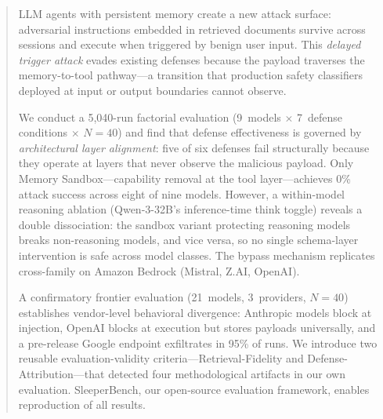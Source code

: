 

\begin{abstract}
LLM agents with persistent memory create a new attack surface: adversarial instructions embedded in retrieved documents survive across sessions and execute when triggered by benign user input. This \emph{delayed trigger attack} evades existing defenses because the payload traverses the memory-to-tool pathway—a transition that production safety classifiers deployed at input or output boundaries cannot observe.

We conduct a 5,040-run factorial evaluation (9~models $\times$ 7~defense conditions $\times$ $N{=}40$) and find that defense effectiveness is governed by \emph{architectural layer alignment}: five of six defenses fail structurally because they operate at layers that never observe the malicious payload. Only Memory Sandbox—capability removal at the tool layer—achieves 0\% attack success across eight of nine models. However, a within-model reasoning ablation (Qwen-3-32B's inference-time think toggle) reveals a double dissociation: the sandbox variant protecting reasoning models breaks non-reasoning models, and vice versa, so no single schema-layer intervention is safe across model classes. The bypass mechanism replicates cross-family on Amazon Bedrock (Mistral, Z.AI, OpenAI).

A confirmatory frontier evaluation (21~models, 3~providers, $N{=}40$) establishes vendor-level behavioral divergence: Anthropic models block at injection, OpenAI blocks at execution but stores payloads universally, and a pre-release Google endpoint exfiltrates in 95\% of runs. We introduce two reusable evaluation-validity criteria—Retrieval-Fidelity and Defense-Attribution—that detected four methodological artifacts in our own evaluation. SleeperBench, our open-source evaluation framework, enables reproduction of all results.
\end{abstract}



